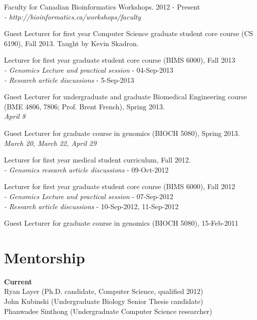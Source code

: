 \documentclass[margin,line]{cv}
\begin{document}
\begin{resume}
    \vspace{-2mm}
    Faculty for Canadian Bioinformatics Workshops. 2012 - Present \\
    \emph{- http://bioinformatics.ca/workshops/faculty}

    \vspace{-2mm}
    Guest Lecturer for first year Computer Science graduate student core course (CS 6190), Fall 2013. Taught by Kevin Skadron.

    \vspace{-2mm}
    Lecturer for first year graduate student core course (BIMS 6000), Fall 2013 \\
    \emph{- Genomics Lecture and practical session} - 04-Sep-2013 \\
    \emph{- Research article discussions} - 5-Sep-2013

    \vspace{-2mm}   
    Guest Lecturer for undergraduate and graduate Biomedical Engineering course (BME 4806, 7806; Prof. Brent French), Spring 2013. \\
    \emph{April 8}

    Guest Lecturer for graduate course in genomics (BIOCH 5080), Spring 2013. \\
	\emph{March 20, March 22, April 29}
	
    Lecturer for first year medical student curriculum, Fall 2012. \\
	\emph{- Genomics research article discussions} - 09-Oct-2012

    \vspace{-2mm}	
    Lecturer for first year graduate student core course (BIMS 6000), Fall 2012 \\
	\emph{- Genomics Lecture and practical session} - 07-Sep-2012 \\
	\emph{- Research article discussions} - 10-Sep-2012, 11-Sep-2012
    
    \vspace{-2mm}
    Guest Lecturer for graduate course in genomics (BIOCH 5080), 15-Feb-2011   
    
    

    \section{\mysidestyle Mentorship}
    \textbf{Current} \\
    Ryan Layer (Ph.D. candidate, Computer Science, qualified 2012) \\
    John Kubinski (Undergraduate Biology Senior Thesis candidate)  \\
    Phanwadee Sinthong (Undergraduate Computer Science researcher) \\
    

\end{resume}
\end{document}
